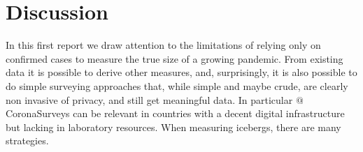 \documentclass{article}
\begin{document}
\section{Discussion}

In this first report we draw attention to the limitations of relying only on confirmed cases to measure the true size of a growing pandemic. From existing data it is possible to derive other measures, and, surprisingly, it is also possible to do simple surveying approaches that, while simple and maybe crude, are clearly non invasive of privacy, and still get meaningful data. In particular  $@$CoronaSurveys can be relevant in countries with a decent digital infrastructure but lacking in laboratory resources. When measuring icebergs,  there are many strategies. 
\end{document}
